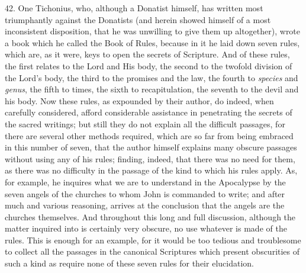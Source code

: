 42. One Tichonius, who, although a Donatist himself, has written most triumphantly against the Donatists (and herein showed himself of a most inconsistent disposition, that he was unwilling to give them up altogether), wrote a book which he called the Book of Rules, because in it he laid down seven rules, which are, as it were, keys to open the secrets of Scripture. And of these rules, the first relates to the Lord and His body, the second to the twofold division of the Lord’s body, the third to the promises and the law, the fourth to \emph{species} and \emph{genus}, the fifth to times, the sixth to recapitulation, the seventh to the devil and his body. Now these rules, as expounded by their author, do indeed, when carefully considered, afford considerable assistance in penetrating the secrets of the sacred writings; but still they do not explain all the difficult passages, for there are several other methods required, which are so far from being embraced in this number of seven, that the author himself explains many obscure passages without using any of his rules; finding, indeed, that there was no need for them, as there was no difficulty in the passage of the kind to which his rules apply. As, for example, he inquires what we are to understand in the Apocalypse by the seven angels of the churches to whom John is commanded to write; and after much and various reasoning, arrives at the conclusion that the angels are the churches themselves. And throughout this long and full discussion, although the matter inquired into is certainly very obscure, no use whatever is made of the rules. This is enough for an example, for it would be too tedious and troublesome to collect all the passages in the canonical Scriptures which present obscurities of such a kind as require none of these seven rules for their elucidation.

